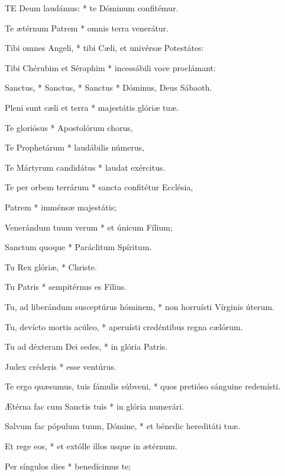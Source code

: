 

\lettrine[lines=2]{T}{E} Deum laudámus: * te Dóminum confitémur.

Te ætérnum Patrem * omnis terra venerátur.

Tibi omnes Angeli, * tibi Cæli, et univérsæ Potestátes:

Tibi Chérubim et Séraphim * incessábili voce proclámant:

Sanctus, * Sanctus, * Sanctus * Dóminus, Deus Sábaoth.

Pleni sunt cæli et terra * majestátis glóriæ tuæ.

Te gloriósus * Apostolórum chorus,

Te Prophetárum * laudábilis númerus,

Te Mártyrum candidátus * laudat exércitus.

Te per orbem terrárum * sancta confitétur Ecclésia,

Patrem * imménsæ majestátis;

Venerándum tuum verum * et únicum Fílium;

Sanctum quoque * Paráclitum Spíritum.

Tu Rex glóriæ, * Christe.

Tu Patris * sempitérnus es Fílius.

Tu, ad liberándum susceptúrus hóminem, * non horruísti Vírginis úterum.

Tu, devícto mortis acúleo, * aperuísti credéntibus regna cælórum.

Tu ad déxteram Dei sedes, * in glória Patris.

Judex créderis * esse ventúrus.


Te ergo quæsumus, tuis fámulis súbveni, * quos pretióso sánguine redemísti.

Ætérna fac cum Sanctis tuis * in glória numerári.

Salvum fac pópulum tuum, Dómine, * et bénedic hereditáti tuæ.

Et rege eos, * et extólle illos usque in ætérnum.

Per síngulos dies * benedícimus te;

